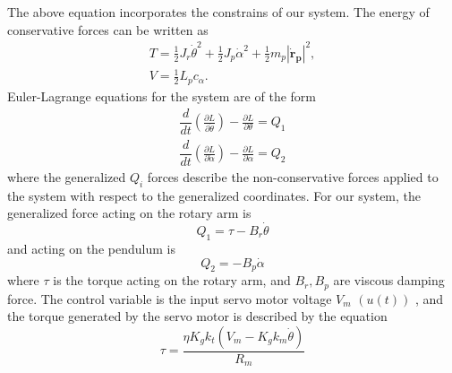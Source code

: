 \documentclass[superscriptaddress,floatfix,reprint,amssymb, amsmath,aps, pre]{revtex4-1}
\begin{document}
{{\begin{equation}
        \end{equation}
        The above equation incorporates the constrains of our system. The energy of conservative forces can be written as 
        \begin{gather}
            T = \frac{1}{2} J_r \dot \theta^2 + \frac{1}{2} J_p \dot \alpha^2 + \frac{1}{2} m_p |\mathbf{\dot r_p}|^2, \\
            V = \frac{1}{2} L_p c_\alpha .
        \end{gather}
        Euler-Lagrange equations for the system are of the form 
        \begin{gather}
            \dfrac{d}{dt}\left(\frac{\partial L}{\partial \dot \theta}\right) - \frac{\partial L}{\partial \theta} = Q_1 \\
            \dfrac{d}{dt}\left(\frac{\partial L}{\partial \dot \alpha}\right) - \frac{\partial L}{\partial \alpha} = Q_2
        \end{gather}
        where the generalized \(Q_i\) forces describe the non-conservative forces applied to the system with respect to the generalized coordinates. For our system, the generalized force acting on the rotary arm is 
        \begin{equation}
            Q_1 = \tau -B_r \dot \theta
        \end{equation}
        and acting on the pendulum is 
        \begin{equation}
            Q_2 = -B_p \dot \alpha
        \end{equation}
        where \(\tau\) is the torque acting on the rotary arm, and \(B_r,B_p\) are viscous damping force. The control variable is the input servo motor voltage \(V_m\) \((u(t))\) , and the torque generated by the servo motor is described by the equation 
        \begin{equation}
            \tau = \frac{\eta K_g k_t(V_m - K_g k_m \dot \theta)}{R_m}
        \end{equation}

}}
\end{document}
